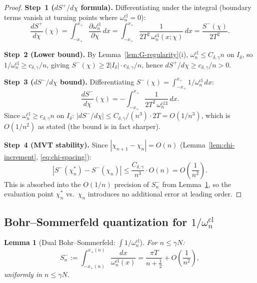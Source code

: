 \documentclass[12pt,a4paper]{amsart}
\newtheorem{lemma}[theorem]{Lemma}
\newcommand{\wncl}{\omega_n^{\mathrm{cl}}}
\begin{document}
\begin{proof}
\textbf{Step~1 ($dS^+/d\chi$ formula).}
Differentiating under the integral (boundary terms vanish at
turning points where $\wncl = 0$):
\[
  \frac{dS^+}{d\chi}(\chi)
  = \int_{-x_+}^{x_+} \frac{\partial \wncl}{\partial \chi}\,dx
  = \int_{-x_+}^{x_+} \frac{1}{2T^2\,\wncl(x;\chi)}\,dx
  = \frac{S^-(\chi)}{2T^2}.
\]

\textbf{Step~2 (Lower bound).}
By Lemma~\ref{lem:G-regularity}(i), $\wncl \le C_{\delta,\gamma}n$
on $I_\delta$, so $1/\wncl \ge c_{\delta,\gamma}/n$, giving
$S^-(\chi) \ge 2|I_\delta|\cdot c_{\delta,\gamma}/n$,
hence $dS^+/d\chi \ge c_{\delta,\gamma}/n > 0$.

\textbf{Step~3 ($dS^-/d\chi$ bound).}
Differentiating $S^-(\chi) = \int_{-x_+}^{x_+} 1/\wncl\,dx$:
\[
  \frac{dS^-}{d\chi}(\chi)
  = -\int_{-x_+}^{x_+} \frac{1}{2T^2\,\wncl^3}\,dx.
\]
Since $\wncl \ge c_{\delta,\gamma}n$ on $I_\delta$:
$|dS^-/d\chi| \le C_{\delta,\gamma}/(n^3)\cdot 2T
= O(1/n^3)$,
which is $O(1/n^2)$ as stated (the bound is in fact sharper).

\textbf{Step~4 (MVT stability).}
Since $|\chi_{n+1} - \chi_n| = O(n)$
(Lemma~\ref{lem:chi-increment}, \eqref{eq:chi-spacing}):
\[
  |S^-(\chi_n^*) - S^-(\chi_n)|
  \le \frac{C_{\delta,\gamma}}{n^3}\cdot O(n)
  = O\!\left(\frac{1}{n^2}\right).
\]
This is absorbed into the $O(1/n)$ precision of $S^-_n$
from Lemma~\ref{lem:denom-bs-pswf},
so the evaluation point $\chi_n^*$ vs.\ $\chi_n$
introduces no additional error at leading order.
\end{proof}

\subsection{Bohr--Sommerfeld quantization for $1/\wncl$}

\begin{lemma}[Dual Bohr--Sommerfeld: $\int 1/\wncl$]%
\label{lem:denom-bs-pswf}
For $n \le \gamma N$:
\begin{equation}\label{eq:denom-BS-lemma}
  S_n^- := \int_{-x_+(n)}^{x_+(n)} \frac{dx}{\wncl(x)}
  = \frac{\pi T}{n + \tfrac{1}{2}}
    + O\!\left(\frac{1}{n^2}\right),
\end{equation}
uniformly in $n \le \gamma N$.
\end{lemma}
\end{document}

